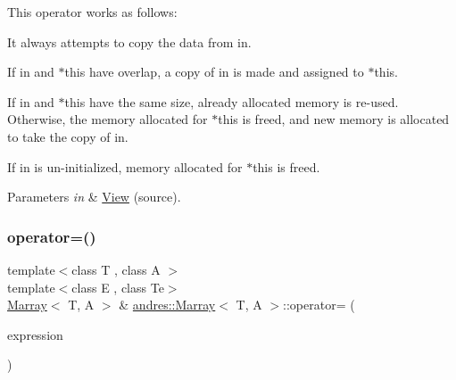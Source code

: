 This operator works as follows\+:
\begin{DoxyItemize}
\item It always attempts to copy the data from \textquotesingle{}in\textquotesingle{}.
\item If \textquotesingle{}in\textquotesingle{} and $\ast$this have overlap, a copy of \textquotesingle{}in\textquotesingle{} is made and assigned to $\ast$this.
\item If \textquotesingle{}in\textquotesingle{} and $\ast$this have the same size, already allocated memory is re-\/used. Otherwise, the memory allocated for $\ast$this is freed, and new memory is allocated to take the copy of \textquotesingle{}in\textquotesingle{}.
\item If \textquotesingle{}in\textquotesingle{} is un-\/initialized, memory allocated for $\ast$this is freed.
\end{DoxyItemize}
\begin{DoxyParams}{Parameters}
{\em in} & \hyperlink{classandres_1_1View}{View} (source). \\
\hline
\end{DoxyParams}
\mbox{\label{classandres_1_1Marray_a248d8da450653279912cec325a4309d2}} 
\subsubsection{\texorpdfstring{operator=()}{operator=()}\hspace{0.1cm}{\footnotesize\ttfamily [4/4]}}
{\footnotesize\ttfamily template$<$class T , class A $>$ \\
template$<$class E , class Te$>$ \\
\hyperlink{classandres_1_1Marray}{Marray}$<$ T, A $>$ \& \hyperlink{classandres_1_1Marray}{andres\+::\+Marray}$<$ T, A $>$\+::operator= (\begin{DoxyParamCaption}\item[{const \hyperlink{classandres_1_1ViewExpression}{View\+Expression}$<$ E, Te $>$ \&}]{expression }\end{DoxyParamCaption})\hspace{0.3cm}{\ttfamily [inline]}}

\mbox{\label{classandres_1_1Marray_aa6f53a2bb7002c69146ae9e2e3544ba2}} 
